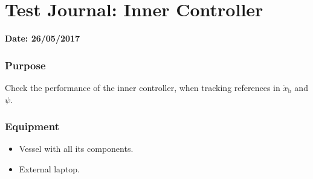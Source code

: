 \chapter{Test Journal: Inner Controller} \label{app:Inner}

\textbf{Date: 26/05/2017}

\subsection*{Purpose}
Check the performance of the inner controller, when tracking references in $\dot{x}_\mathrm{b}$ and $\psi$.

\subsection*{Equipment}
\begin{itemize}
    \item Vessel with all its components. 
    \item External laptop.
\end{itemize}

